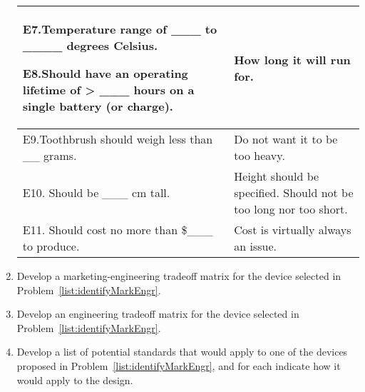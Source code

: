 \begin{enumerate}
\begin{onlysolution}
\begin{tabular}{l|l}
E7.Temperature range of \_\_\_ to \_\_\_\_ degrees Celsius.


E8.Should have an operating lifetime of \textgreater{} \_\_\_ hours on a
single battery (or charge). &
How long it will run for.			\\ \hline

E9.Toothbrush should weigh less than \_\_ grams. &
Do not want it to be too heavy.			\\ \hline

E10. Should be \_\_\_ cm tall. &
Height should be specified. Should not be too long nor too short.			\\ \hline


E11. Should cost no more than \$\_\_\_ to produce. &
Cost is virtually always an issue.			\\ \hline
\end{tabular}

 \end{onlysolution}    
    
    
    
    
  \item
    Develop a marketing-engineering tradeoff matrix for the device
    selected in Problem~\ref{list:identifyMarkEngr}.
 \begin{onlysolution}
 
 \end{onlysolution}
    
  \item
    Develop an engineering tradeoff matrix for the device selected in
    Problem~\ref{list:identifyMarkEngr}.
 \begin{onlysolution}
 
 \end{onlysolution}

  \item
    Develop a list of potential standards that would apply to one of the
    devices proposed in Problem~\ref{list:identifyMarkEngr}, and for each indicate how it would
    apply to the design.
    
\begin{onlysolution}


\end{onlysolution}
\end{enumerate}
